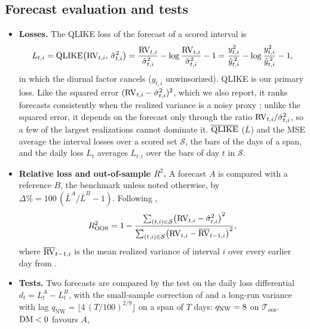 \subsection{Forecast evaluation and tests}
\label{sec:rh_results_eval}
\begin{itemize}
\item \textbf{Losses.} The QLIKE loss \citep{Patton2011} of the forecast of a scored interval is
  \[
    L_{t,i} = \operatorname{QLIKE}\bigl(\mathrm{RV}_{t,i},\, \hat\sigma^2_{t,i}\bigr)
      = \frac{\mathrm{RV}_{t,i}}{\hat\sigma^2_{t,i}} - \log\frac{\mathrm{RV}_{t,i}}{\hat\sigma^2_{t,i}} - 1
      = \frac{y_{t,i}^2}{\hat y_{t,i}^{\,2}} - \log\frac{y_{t,i}^2}{\hat y_{t,i}^{\,2}} - 1 ,
  \]
  in which the diurnal factor cancels ($y_{t,i}$ unwinsorized). QLIKE is our primary loss. Like the squared error
  $(\mathrm{RV}_{t,i} - \hat\sigma^2_{t,i})^2$, which we also report, it ranks forecasts consistently when the realized
  variance is a noisy proxy \citep{Patton2011}; unlike the squared error, it depends on the forecast only through the
  ratio $\mathrm{RV}_{t,i}/\hat\sigma^2_{t,i}$, so a few of the largest realizations cannot dominate it. $\overline{\operatorname{QLIKE}}$
  ($\bar L$) and the MSE average the interval losses over a scored set $\mathcal S$, the bars of the days of a span,
  and the daily loss $L_t$ averages $L_{t,i}$ over the bars of day $t$ in $\mathcal S$.
\item \textbf{Relative loss and out-of-sample $R^2$.} A forecast $A$ is compared with a reference $B$, the benchmark
  unless noted otherwise, by $\Delta\% = 100\,(\bar L^{A}/\bar L^{B} - 1)$. Following \citet{CampbellThompson2008},
  \[
    R^2_{\mathrm{OOS}} = 1 - \frac{\sum_{(t,i) \in \mathcal S} \bigl(\mathrm{RV}_{t,i} - \hat\sigma^2_{t,i}\bigr)^2}
      {\sum_{(t,i) \in \mathcal S} \bigl(\mathrm{RV}_{t,i} - \overline{\mathrm{RV}}_{t-1,i}\bigr)^2},
  \]
  where $\overline{\mathrm{RV}}_{t-1,i}$ is the mean realized variance of interval $i$ over every earlier day from
  \rhoosBenchStart.
\item \textbf{Tests.} Two forecasts are compared by the \citet{DieboldMariano1995} test on the daily loss differential
  $d_t = L^{A}_t - L^{B}_t$, with the small-sample correction of \citet{HarveyLeybourneNewbold1997} and a
  \citet{NeweyWest1987} long-run variance with lag $q_{\mathrm{NW}} = \lfloor 4\,(T/100)^{2/9} \rfloor$ on a span of
  $T$ days: $q_{\mathrm{NW}} = 8$ on $\mathcal T_{\mathrm{oos}}$. $\mathrm{DM} < 0$ favours $A$, %

\end{itemize}
